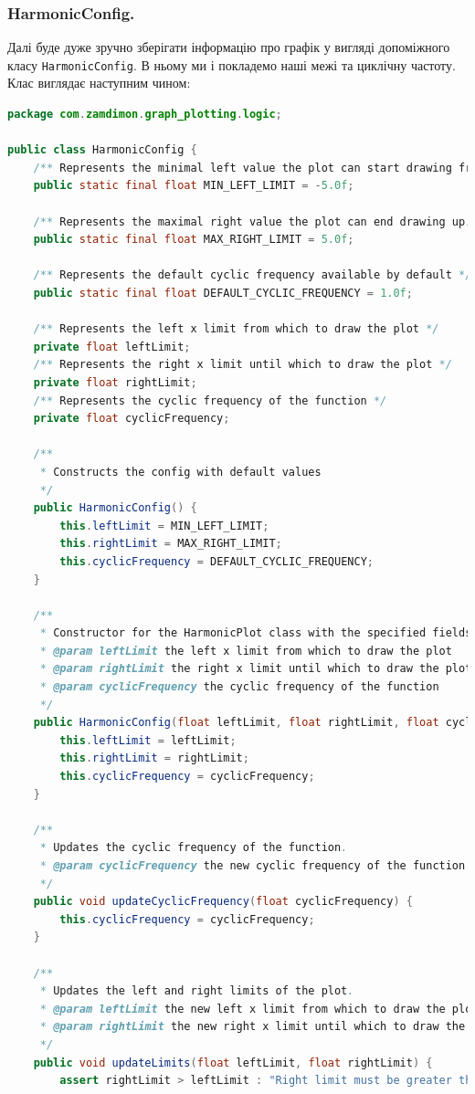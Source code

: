 \documentclass[oneside,solution]{android-assign}
\begin{document}
\subsubsection{HarmonicConfig.} Далі буде дуже зручно зберігати інформацію про графік у вигляді допоміжного класу \texttt{HarmonicConfig}. В ньому ми і покладемо наші межі та циклічну частоту. Клас виглядає наступним чином:
\begin{lstlisting}[language=java]
package com.zamdimon.graph_plotting.logic;

public class HarmonicConfig {
    /** Represents the minimal left value the plot can start drawing from. */
    public static final float MIN_LEFT_LIMIT = -5.0f;

    /** Represents the maximal right value the plot can end drawing up. */
    public static final float MAX_RIGHT_LIMIT = 5.0f;

    /** Represents the default cyclic frequency available by default */
    public static final float DEFAULT_CYCLIC_FREQUENCY = 1.0f;

    /** Represents the left x limit from which to draw the plot */
    private float leftLimit;
    /** Represents the right x limit until which to draw the plot */
    private float rightLimit;
    /** Represents the cyclic frequency of the function */
    private float cyclicFrequency;

    /**
     * Constructs the config with default values
     */
    public HarmonicConfig() {
        this.leftLimit = MIN_LEFT_LIMIT;
        this.rightLimit = MAX_RIGHT_LIMIT;
        this.cyclicFrequency = DEFAULT_CYCLIC_FREQUENCY;
    }

    /**
     * Constructor for the HarmonicPlot class with the specified fields.
     * @param leftLimit the left x limit from which to draw the plot
     * @param rightLimit the right x limit until which to draw the plot
     * @param cyclicFrequency the cyclic frequency of the function
     */
    public HarmonicConfig(float leftLimit, float rightLimit, float cyclicFrequency) {
        this.leftLimit = leftLimit;
        this.rightLimit = rightLimit;
        this.cyclicFrequency = cyclicFrequency;
    }

    /**
     * Updates the cyclic frequency of the function.
     * @param cyclicFrequency the new cyclic frequency of the function
     */
    public void updateCyclicFrequency(float cyclicFrequency) {
        this.cyclicFrequency = cyclicFrequency;
    }

    /**
     * Updates the left and right limits of the plot.
     * @param leftLimit the new left x limit from which to draw the plot
     * @param rightLimit the new right x limit until which to draw the plot
     */
    public void updateLimits(float leftLimit, float rightLimit) {
        assert rightLimit > leftLimit : "Right limit must be greater than the left one";


\end{lstlisting}
\end{document}
